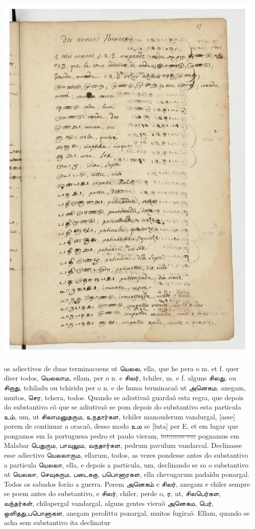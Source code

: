 \documentclass[12pt,a4paper]{scrbook}
\begin{document}
      
\newpage
\hypertarget{img-47}{
    \includegraphics[width=\textwidth]{img-47}}
\newpage
      

os adiectivos de duas terminacoens ut யெலல, ella, que he pera o m. et f. quer 
diser todos, யெலலாம, ellam, per o n. e சிலர், tchiler, m. e f. alguns சிலது, ou 
சிறாது, tchiladu ou tchiridu per o n. e de huma terminacaõ ut அனெகம, anegam, 
muitos, செர, tchera, todos. Quando se adiutivaõ guardaõ esta regra, que depois do 
substantivo cõ que se adiutivaõ se pom depois do substantivo esta particula உம், 
um, ut சிலாமனுதரும, உநதார்கள, tchiler manouderum vandurgal, [asse] porem de continuar 
a oracaõ, desso modo உம se [luta] per E, et em lugar que pongamos em la portuguesa 
pedro et paulo vieram, \sout{\textcolor{gray}{lutamus em}}
pognamus em Malabar பெதுரும, பாவுலும, வநதார்கள, pedrum pavulum vandarcal. 
Declinasse esse adiectivo யெலலாரும, ellarum, todos, as vezes pondesse antes do 
substantivo a particula யெலலா, ella, e depois a particula, um, declinando se so 
o substantivo ut யெலலா, செவுகரும, படைககு, பபொனாரகள, ella chevugarum padaïdu 
ponargal. Todos os sabados forão a guerra. Porem அனெகம் e சிலர், anegam e chiler 
sempre se poem antes do substantivo, e சிலர், chiler, perde o, ர, ut, சிலபெர்கள, வந்தர்கள், chilapergal vandargal, alguns gentes vieraõ அனெகம, பெர், ஒளிதது,பபொனாகள, 
anegam perolittu ponargal, muitos fugiraõ.
Ellam, quando se acha sem substantivo ita declinatur
	
\end{document}
